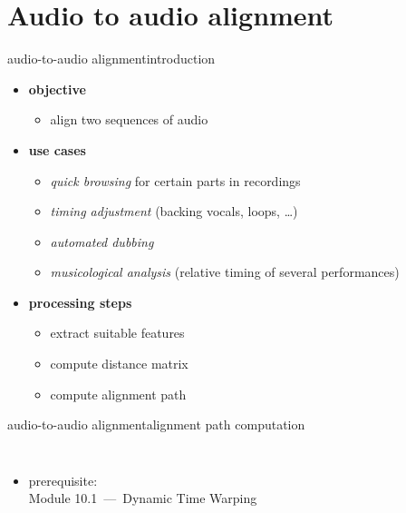     \section[A2A]{Audio to audio alignment}
        \begin{frame}{audio-to-audio alignment}{introduction}
            \begin{itemize}
                \item	\textbf{objective}
                    \begin{itemize}
                        \item	align two sequences of audio
                    \end{itemize}
                \bigskip
                \item<2->	\textbf{use cases}
                    \begin{itemize}
                        \item	\textit{quick browsing} for certain parts in recordings
                        \item	\textit{timing adjustment} (backing vocals, loops, \ldots)
                        \item	\textit{automated dubbing}
                        \item	\textit{musicological analysis} (relative timing of several performances)
                    \end{itemize}
                \bigskip
                \item<3->	\textbf{processing steps}
                    \begin{itemize}
                        \item	extract suitable features
                        \item	compute distance matrix
                        \item	compute alignment path
                    \end{itemize}
            \end{itemize}
        \end{frame}

        \begin{frame}{audio-to-audio alignment}{alignment path computation}
                 \vspace{-3mm}
           \begin{columns}
            \vspace{4mm}
            \begin{itemize}
                \item prerequisite:\\ Module 10.1~---~Dynamic Time Warping
            \end{itemize}
            
                \vspace{-13mm}
            \end{columns}
        \end{frame}

